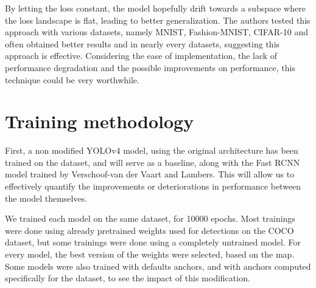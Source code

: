 By letting the loss constant, the model hopefully drift towards a subspace where the loss landscape is flat, leading to better generalization. The authors tested this approach with various datasets, namely MNIST\cite{mnist}, Fashion-MNIST\cite{fashionMNIST}, CIFAR-10\cite{cifar} and often obtained better results and in nearly every datasets, suggesting this approach is effective. Considering the ease of implementation, the lack of performance degradation and the possible improvements on performance, this technique could be very worthwhile.

\section{Training methodology}
First, a non modified YOLOv4 model, using the original architecture has been trained on the dataset, and will serve as a baseline, along with the Fast RCNN model trained by Verschoof-van der Vaart and Lambers\cite{wouter2019}. This will allow us to effectively quantify the improvements or deteriorations in performance between the model themselves. 

We trained each model on the same dataset, for 10000 epochs. Most trainings were done using already pretrained weights used for detections on the COCO dataset, but some trainings were done using a completely untrained model. For every model, the best version of the weights were selected, based on the \gls{map}. Some models were also trained with defaults anchors, and with anchors computed specifically for the dataset, to see the impact of this modification.


